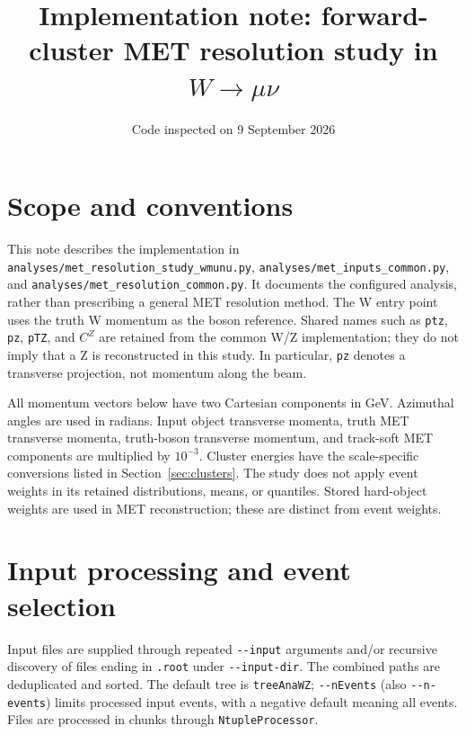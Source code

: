 \documentclass[11pt,a4paper]{article}
\title{Implementation note: forward-cluster MET resolution study in $W\to\mu\nu$}
\author{}
\date{Code inspected on 9 September 2026}
\newcommand{\code}[1]{\texttt{\nolinkurl{#1}}}
\begin{document}
\maketitle

\section{Scope and conventions}
This note describes the implementation in
\code{analyses/met_resolution_study_wmunu.py},
\code{analyses/met_inputs_common.py}, and
\code{analyses/met_resolution_common.py}.
It documents the configured analysis, rather than prescribing a general MET
resolution method. The W entry point uses the truth W momentum as the boson
reference. Shared names such as \code{ptz}, \code{pz}, \code{pTZ}, and $C^Z$
are retained from the common W/Z implementation; they do not imply that a Z
is reconstructed in this study. In particular, \code{pz} denotes a transverse
projection, not momentum along the beam.

All momentum vectors below have two Cartesian components in GeV. Azimuthal
angles are used in radians. Input object transverse momenta, truth MET
transverse momenta, truth-boson transverse momentum, and track-soft MET
components are multiplied by $10^{-3}$. Cluster energies have the
scale-specific conversions listed in Section~\ref{sec:clusters}.
The study does not apply event weights in its retained distributions, means,
or quantiles. Stored hard-object weights are used in MET reconstruction;
these are distinct from event weights.

\section{Input processing and event selection}
Input files are supplied through repeated \code{--input} arguments and/or
recursive discovery of files ending in \code{.root} under \code{--input-dir}.
The combined paths are deduplicated and sorted. The default tree is
\code{treeAnaWZ}; \code{--nEvents} (also \code{--n-events}) limits processed
input events, with a negative default meaning all events. Files are processed
in chunks through \code{NtupleProcessor}.
\end{document}
